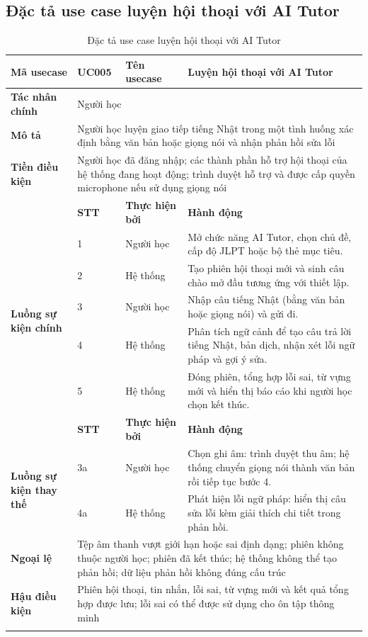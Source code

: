 \documentclass[../DoAn.tex]{subfiles}
\begin{document}
\subsection{Đặc tả use case luyện hội thoại với AI Tutor}
\label{subsection:2.3.3}

{\footnotesize\singlespacing
\begin{longtable}{|p{2.8cm}|p{1.0cm}|p{2.2cm}|p{7.5cm}|}
\hline
\textbf{Mã usecase} & \textbf{UC005} & \textbf{Tên usecase} & \multicolumn{1}{l|}{Luyện hội thoại với AI Tutor} \\
\hline
\textbf{Tác nhân chính} & \multicolumn{3}{p{11.1cm}|}{Người học} \\
\hline
\textbf{Mô tả} & \multicolumn{3}{p{11.1cm}|}{Người học luyện giao tiếp tiếng Nhật trong một tình huống xác định bằng văn bản hoặc giọng nói và nhận phản hồi sửa lỗi} \\
\hline
\textbf{Tiền điều kiện} & \multicolumn{3}{p{11.1cm}|}{Người học đã đăng nhập; các thành phần hỗ trợ hội thoại của hệ thống đang hoạt động; trình duyệt hỗ trợ và được cấp quyền microphone nếu sử dụng giọng nói} \\
\hline
 & \textbf{STT} & \textbf{Thực hiện bởi} & \textbf{Hành động} \\
\hline
\multirow{5}{2.8cm}{\textbf{Luồng sự kiện chính}} & 1 & Người học & Mở chức năng AI Tutor, chọn chủ đề, cấp độ JLPT hoặc bộ thẻ mục tiêu. \\
\cline{2-4}
 & 2 & Hệ thống & Tạo phiên hội thoại mới và sinh câu chào mở đầu tương ứng với thiết lập. \\
\cline{2-4}
 & 3 & Người học & Nhập câu tiếng Nhật (bằng văn bản hoặc giọng nói) và gửi đi. \\
\cline{2-4}
 & 4 & Hệ thống & Phân tích ngữ cảnh để tạo câu trả lời tiếng Nhật, bản dịch, nhận xét lỗi ngữ pháp và gợi ý sửa. \\
\cline{2-4}
 & 5 & Hệ thống & Đóng phiên, tổng hợp lỗi sai, từ vựng mới và hiển thị báo cáo khi người học chọn kết thúc. \\
\hline
 & \textbf{STT} & \textbf{Thực hiện bởi} & \textbf{Hành động} \\
\hline
\multirow{2}{2.8cm}{\textbf{Luồng sự kiện thay thế}} & 3a & Người học & Chọn ghi âm: trình duyệt thu âm; hệ thống chuyển giọng nói thành văn bản rồi tiếp tục bước 4. \\
\cline{2-4}
 & 4a & Hệ thống & Phát hiện lỗi ngữ pháp: hiển thị câu sửa lỗi kèm giải thích chi tiết trong phản hồi. \\
\hline
\textbf{Ngoại lệ} & \multicolumn{3}{p{11.1cm}|}{Tệp âm thanh vượt giới hạn hoặc sai định dạng; phiên không thuộc người học; phiên đã kết thúc; hệ thống không thể tạo phản hồi; dữ liệu phản hồi không đúng cấu trúc} \\
\hline
\textbf{Hậu điều kiện} & \multicolumn{3}{p{11.1cm}|}{Phiên hội thoại, tin nhắn, lỗi sai, từ vựng mới và kết quả tổng hợp được lưu; lỗi sai có thể được sử dụng cho ôn tập thông minh} \\
\hline
\caption{Đặc tả use case luyện hội thoại với AI Tutor}
\label{table:UC005}\\
\end{longtable}
}
\end{document}

